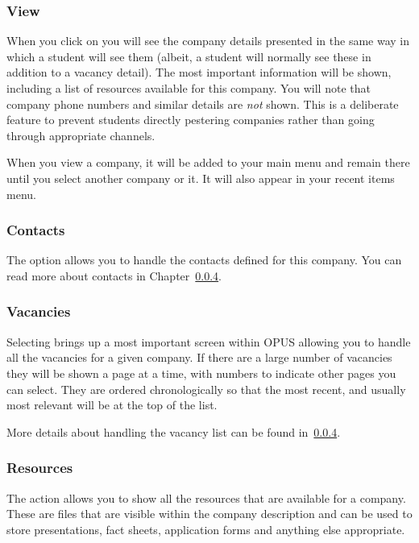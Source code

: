 \documentclass[12 pt]{book}
\begin{document}
\subsubsection{View}

When you click on  you will see the company details presented
in the same way in which a student will see them (albeit, a student will
normally see these in addition to a vacancy detail). The most important
information will be shown, including a list of resources available for this
company. You will note that company phone numbers and similar details are
\emph{not} shown. This is a deliberate feature to prevent students directly
pestering companies rather than going through appropriate channels.

When you view a company, it will be added to your main menu and remain there
until you select another company or  it. It will also appear
in your recent items menu.

\subsubsection{Contacts}

The  option allows you to handle the contacts defined for
this company. You can read more about contacts in Chapter~\ref{}.

\subsubsection{Vacancies}

Selecting  brings up a most important screen within OPUS
allowing you to handle all the vacancies for a given company. If there are
a large number of vacancies they will be shown a page at a time, with numbers
to indicate other pages you can select. They are ordered chronologically so
that the most recent, and usually most relevant will be at the top of the
list.

More details about handling the vacancy list can be found in~\ref{}.

\subsubsection{Resources}

The  action allows you to show all the resources that are
available for a company. These are files that are visible within the company
description and can be used to store presentations, fact sheets, application
forms and anything else appropriate.
\end{document}
